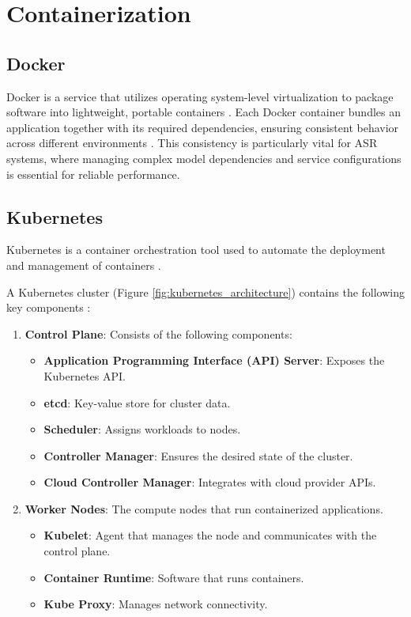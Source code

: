 \section{Containerization}
\subsection{Docker}
Docker is a service that utilizes operating system-level virtualization to package software into lightweight, portable containers \cite{docker_definition}. Each Docker container bundles an application together with its required dependencies, ensuring consistent behavior across different environments \cite{container_definition}. This consistency is particularly vital for ASR systems, where managing complex model dependencies and service configurations is essential for reliable performance.
\subsection{Kubernetes}
Kubernetes is a container orchestration tool used to automate the deployment and management of containers \cite{k8s_definition}. 

A Kubernetes cluster (Figure \ref{fig:kubernetes_architecture}) contains the following key components \cite{k8s_cluster}:
\begin{enumerate}
    \item \textbf{Control Plane}: Consists of the following components:
    \begin{itemize}
        \item \textbf{Application Programming Interface (API) Server}: Exposes the Kubernetes API.
        \item \textbf{etcd}: Key-value store for cluster data.
        \item \textbf{Scheduler}: Assigns workloads to nodes.
        \item \textbf{Controller Manager}: Ensures the desired state of the cluster.
        \item \textbf{Cloud Controller Manager}: Integrates with cloud provider APIs.
    \end{itemize}
    \item \textbf{Worker Nodes}: The compute nodes that run containerized applications.
    \begin{itemize}
        \item \textbf{Kubelet}: Agent that manages the node and communicates with the control plane.
        \item \textbf{Container Runtime}: Software that runs containers.
        \item \textbf{Kube Proxy}: Manages network connectivity.
    \end{itemize}
\end{enumerate}

